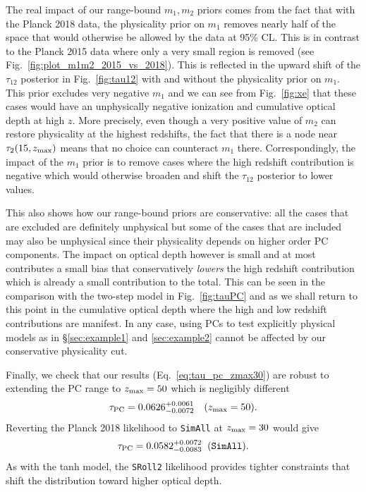 \documentclass[prd,twocolumn,amsmath,amssymb,floatfix,superscriptaddress,nofootinbib]{revtex4-1}
\newcommand{\zmax}{z_{\rm max}}
\newcommand{\beq}{\begin{equation}}
\newcommand{\eeq}{\end{equation}}
\begin{document}
{The real impact of our range-bound $m_1,m_2$ priors comes from the fact that with the Planck 2018 data, the physicality prior on $m_1$
removes nearly half of the space that would otherwise be allowed by the
data at 95\% CL.  This is in contrast to the Planck 2015 data where only a very small region is removed (see Fig.~\ref{fig:plot_m1m2_2015_vs_2018}).  
This is reflected in the upward shift of the $\tau_{12}$ posterior in Fig.~\ref{fig:tau12} with and without the physicality prior on $m_1$.   This prior excludes very negative $m_1$ and we can see from Fig.~\ref{fig:xe} that these cases would have an unphysically negative ionization and cumulative optical depth at high $z$.  More precisely, even though a very positive value 
of $m_2$ can restore physicality at the highest redshifts, the fact that there is a node near $\tau_2(15,z_{\rm max})$ means that no choice can counteract $m_1$ there.  
Correspondingly, the impact of the $m_1$ prior is to remove
cases where the high redshift contribution is negative which would otherwise broaden and shift the $\tau_{12}$ posterior to lower values.

This also shows how our range-bound priors 
are conservative: all the cases that are excluded are definitely unphysical but some of the cases that are included
may also be unphysical since their physicality depends on higher order PC components.  The impact on optical depth  however is small and at most contributes a small bias that conservatively {\it lowers} the high redshift contribution which is already a small contribution to the total.  
This can be seen  in the comparison with the two-step model 
in Fig.~\ref{fig:tauPC} and as we shall return to this point in the cumulative optical depth where the high and low redshift contributions are manifest.
In any case, using PCs to 
test explicitly physical models as in \S \ref{sec:example1} and
\ref{sec:example2} cannot be affected by our conservative physicality
cut.

Finally, we check that our results (Eq.~\ref{eq:tau_pc_zmax30}) are robust to
 extending the PC
range to
$z_{\rm max}=50$ which is negligibly different
%
\beq
\tau_{\rm PC} = 0.0626^{+0.0061}_{-0.0072}\quad (\zmax=50).
\eeq
%
Reverting the Planck 2018 likelihood to \texttt{SimAll} at $z_{\rm max}=30$ would give
\beq
\tau_{\rm PC} = 0.0582 ^{+0.0072}_{-0.0083}\;\; (\texttt{SimAll}).
\eeq
As with the tanh model, the \texttt{SRoll2} likelihood provides tighter constraints that shift the distribution toward higher optical depth.










}
\end{document}

